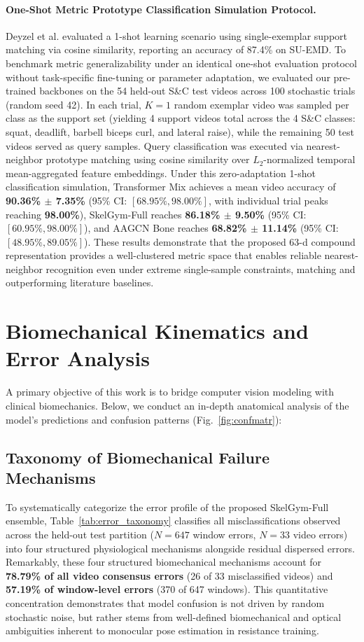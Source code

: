 \documentclass[runningheads]{llncs}
\begin{document}
\paragraph{One-Shot Metric Prototype Classification Simulation Protocol.}
Deyzel et al. \cite{deyzel2023} evaluated a 1-shot learning scenario using single-exemplar support matching via cosine similarity, reporting an accuracy of 87.4\% on SU-EMD. To benchmark metric generalizability under an identical one-shot evaluation protocol without task-specific fine-tuning or parameter adaptation, we evaluated our pre-trained backbones on the 54 held-out S\&C test videos across 100 stochastic trials (random seed 42). In each trial, $K=1$ random exemplar video was sampled per class as the support set (yielding 4 support videos total across the 4 S\&C classes: squat, deadlift, barbell biceps curl, and lateral raise), while the remaining 50 test videos served as query samples. Query classification was executed via nearest-neighbor prototype matching using cosine similarity over $L_2$-normalized temporal mean-aggregated feature embeddings. Under this zero-adaptation 1-shot classification simulation, Transformer Mix achieves a mean video accuracy of \textbf{90.36\% $\pm$ 7.35\%} (95\% CI: $[68.95\%, 98.00\%]$, with individual trial peaks reaching \textbf{98.00\%}), SkelGym-Full reaches \textbf{86.18\% $\pm$ 9.50\%} (95\% CI: $[60.95\%, 98.00\%]$), and AAGCN Bone reaches \textbf{68.82\% $\pm$ 11.14\%} (95\% CI: $[48.95\%, 89.05\%]$). These results demonstrate that the proposed 63-d compound representation provides a well-clustered metric space that enables reliable nearest-neighbor recognition even under extreme single-sample constraints, matching and outperforming literature baselines.

\section{Biomechanical Kinematics and Error Analysis}
\label{sec:biomechanical_analysis}

A primary objective of this work is to bridge computer vision modeling with clinical biomechanics. Below, we conduct an in-depth anatomical analysis of the model's predictions and confusion patterns (Fig.~\ref{fig:confmatr}):

\subsection{Taxonomy of Biomechanical Failure Mechanisms}
To systematically categorize the error profile of the proposed SkelGym-Full ensemble, Table~\ref{tab:error_taxonomy} classifies all misclassifications observed across the held-out test partition ($N=647$ window errors, $N=33$ video errors) into four structured physiological mechanisms alongside residual dispersed errors. Remarkably, these four structured biomechanical mechanisms account for \textbf{78.79\% of all video consensus errors} (26 of 33 misclassified videos) and \textbf{57.19\% of window-level errors} (370 of 647 windows). This quantitative concentration demonstrates that model confusion is not driven by random stochastic noise, but rather stems from well-defined biomechanical and optical ambiguities inherent to monocular pose estimation in resistance training.
\end{document}
